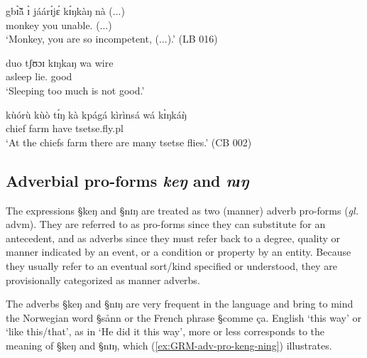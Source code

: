 \begin{exe}
\ex\label{ex:GRM-adj-mann-alot}
\begin{xlist}
\ex\label{ex:GRM-adj-mann-alot-v}
\gll gbɪ̃̀ã́         	ɪ̀     	jáárɪ́jɛ́      	kɪ́ŋkàŋ     	nà
(...)\\ 
monkey 	you   	unable.{\pfv} 	  {\advm} {\foc} (...)\\
\glt `Monkey, you are so incompetent, (...).' (LB 016)

\ex\label{ex:GRM-adj-mann-alot-n}

\gll duo tʃʊɔɪ kɪŋkaŋ wa wire\\
asleep lie.{\nmlz} {\advm} {\neg} good\\
\glt `Sleeping too much is not good.'

\ex\label{ex:GRM-adj-mann-alot-quant}
\gll kùórù 	kùò  	tɪ́ŋ 	kà   kpágá kìrìnsá wá  kɪ̀ŋkáŋ̀\\
 chief farm {\art} {\egr} have tsetse.fly.{\sc pl}   {\foc}  {\quant}\\
\glt 	`At the chiefs farm there are many tsetse flies.' (CB 002)

\end{xlist}
\end{exe}






\subsection{Adverbial pro-forms {\it keŋ} and {\it nɪŋ}}
\label{sec:GRM-adv-pro}

The expressions  {\S keŋ} and {\S nɪŋ} are treated as  two (manner) adverb
pro-forms ({\it gl.} {\sc advm}).  They are referred to as pro-forms since they
can substitute for an antecedent,  and  as  adverbs since they must refer back
to a
degree, quality or manner indicated by an event, or  a condition or property by 
an entity. Because they usually refer to an eventual sort/kind specified or
understood, they are provisionally categorized as manner adverbs.

The adverbs   {\S keŋ} and {\S nɪŋ} are very frequent in the
language and bring
to mind the Norwegian word {\S sånn} or the French phrase {\S comme \c{c}a}. 
English `this way' or `like this/that', as in `He did it this way',  more
or less corresponds to
the meaning of   {\S keŋ} and {\S nɪŋ}, which (\ref{ex:GRM-adv-pro-keng-ning})
illustrates.


